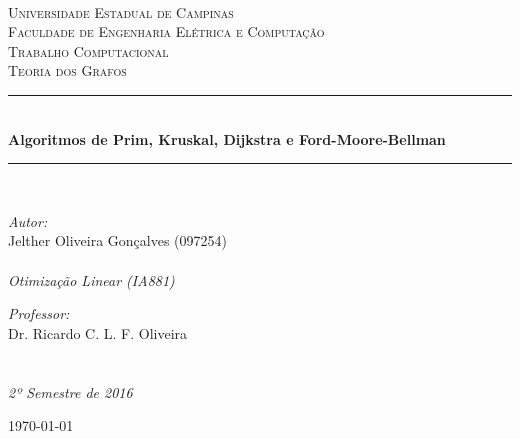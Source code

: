 \begin{titlepage}
	\begin{center}

	\begin{minipage}{5in}
	  \centering
	  \hspace*{.2in}
	\end{minipage}
	~\\[1cm]

	\textsc{\LARGE Universidade Estadual de Campinas}\\[0.3cm]
	\textsc{\large Faculdade de Engenharia Elétrica e Computação}\\[1.5cm]
	\textsc{\Large Trabalho Computacional}\\[0.5cm]
	\textsc{\Large Teoria dos Grafos}\\[0.5cm]

	\hrule~\\[0.01cm]
	{ \huge \bfseries Algoritmos de Prim, Kruskal, Dijkstra e Ford-Moore-Bellman\\[0.4cm] }
	\hrule

	~\\[1cm]
	\noindent
	\begin{minipage}[t]{0.5\textwidth}
		\begin{flushleft} \large
			\emph{Autor:}\\
			Jelther Oliveira Gonçalves (097254)
			\\
			~\\
			\emph{Otimização Linear (IA881)}\\			
		\end{flushleft}
	\end{minipage}%
	\begin{minipage}[t]{0.5\textwidth}
		\begin{flushright} \large
			\emph{Professor:} \\
			Dr. Ricardo C. L. F. Oliveira
			\\
			~\\
			~\\
			\emph{2º Semestre de 2016}\\
		\end{flushright}
	\end{minipage}

	\vfill

	{\large \today}
	\end{center}
\end{titlepage}
